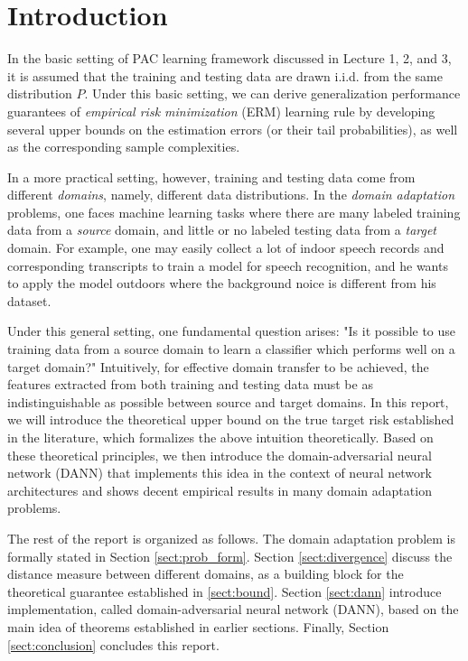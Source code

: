 \section{Introduction}\label{sect:intro}
In the basic setting of PAC learning framework discussed in Lecture 1, 2, and 3, it is assumed that the training and testing data are drawn i.i.d. from the same distribution $P$. Under this basic setting, we can derive generalization performance guarantees of \textit{empirical risk minimization} (ERM) learning rule by developing several upper bounds on the estimation errors (or their tail probabilities), as well as the corresponding sample complexities.

In a more practical setting, however, training and testing data come from different \textit{domains}, namely, different data distributions. In the \textit{domain adaptation} problems, one faces machine learning tasks where there are many labeled training data from a \textit{source} domain, and little or no labeled testing data from a \textit{target} domain. For example, one may easily collect a lot of indoor speech records and corresponding transcripts to train a model for speech recognition, and he wants to apply the model outdoors where the background noice is different from his dataset.

Under this general setting, one fundamental question arises: "Is it possible to use training data from a source domain to learn a classifier which performs well on a target domain?" Intuitively, for effective domain transfer to be achieved, the features extracted from both training and testing data must be as indistinguishable as possible between source and target domains. In this report, we will introduce the theoretical upper bound on the true target risk established in the literature, which formalizes the above intuition theoretically. Based on these theoretical principles, we then introduce the domain-adversarial neural network (DANN) that implements this idea in the context of neural network architectures and shows decent empirical results in many domain adaptation problems.

The rest of the report is organized as follows. The domain adaptation problem is formally stated in Section \ref{sect:prob_form}. Section \ref{sect:divergence} discuss the distance measure between different domains, as a building block for the theoretical guarantee established in \ref{sect:bound}. Section \ref{sect:dann} introduce implementation, called domain-adversarial neural network (DANN), based on the main idea of theorems established in earlier sections. Finally, Section \ref{sect:conclusion} concludes this report.

